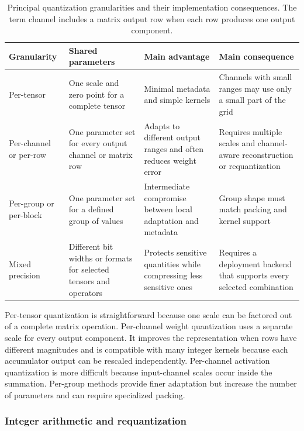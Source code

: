 \documentclass[
    a4paper,
    12pt,
    titlepage,
    bibliography=totoc,
    twoside=on,
    parskip=false,
    numbers=noenddot,
    cleardoublepage=empty,
    DIV=12,
    BCOR=12.0mm,
    headheight=36pt,
    headings=openright
]{scrreprt}
\begin{document}
\begin{table}[htbp]
    \centering
    \small
    \caption[Granularity of neural-network quantization.]{Principal quantization granularities and their implementation consequences. The term channel includes a matrix output row when each row produces one output component.}
    \label{tab:fundamental_quantization_granularity}
    \begin{tabularx}{\textwidth}{>{\raggedright\arraybackslash}p{3.1cm}>{\raggedright\arraybackslash}p{3.3cm}YY}
        \toprule
        Granularity & Shared parameters & Main advantage & Main consequence \\
        \midrule
        Per-tensor & One scale and zero point for a complete tensor & Minimal metadata and simple kernels & Channels with small ranges may use only a small part of the grid \\
        Per-channel or per-row & One parameter set for every output channel or matrix row & Adapts to different output ranges and often reduces weight error & Requires multiple scales and channel-aware reconstruction or requantization \\
        Per-group or per-block & One parameter set for a defined group of values & Intermediate compromise between local adaptation and metadata & Group shape must match packing and kernel support \\
        Mixed precision & Different bit widths or formats for selected tensors and operators & Protects sensitive quantities while compressing less sensitive ones & Requires a deployment backend that supports every selected combination \\
        \bottomrule
    \end{tabularx}
\end{table}

Per-tensor quantization is straightforward because one scale can be factored out of a complete matrix operation. Per-channel weight quantization uses a separate scale for every output component. It improves the representation when rows have different magnitudes and is compatible with many integer kernels because each accumulator output can be rescaled independently. Per-channel activation quantization is more difficult because input-channel scales occur inside the summation. Per-group methods provide finer adaptation but increase the number of parameters and can require specialized packing.\autocite{krishnamoorthiQuantizingDeepConvolutional2018,nagelWhitePaperNeural2021}

\subsubsection{Integer arithmetic and requantization}
\end{document}
